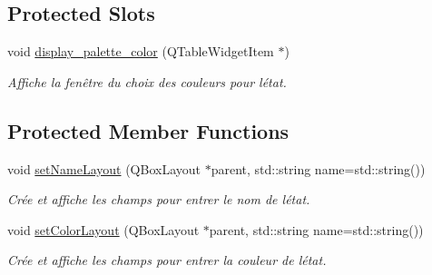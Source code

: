 \subsection*{Protected Slots}
\begin{DoxyCompactItemize}
\item 
void \mbox{\hyperlink{class_state_interface_a7cbb40dbcd158c1a871a50db7148e437}{display\+\_\+palette\+\_\+color}} (Q\+Table\+Widget\+Item $\ast$)
\begin{DoxyCompactList}\small\item\em Affiche la fenêtre du choix des couleurs pour l\textquotesingle{}état. \end{DoxyCompactList}\end{DoxyCompactItemize}
\subsection*{Protected Member Functions}
\begin{DoxyCompactItemize}
\item 
void \mbox{\hyperlink{class_state_interface_ac719c2f6bf1897ac5c7e852e73b95aca}{set\+Name\+Layout}} (Q\+Box\+Layout $\ast$parent, std\+::string name=std\+::string())
\begin{DoxyCompactList}\small\item\em Crée et affiche les champs pour entrer le nom de l\textquotesingle{}état. \end{DoxyCompactList}\item 
void \mbox{\hyperlink{class_state_interface_aaa101c2f5dc677034b0fdef57c45ce68}{set\+Color\+Layout}} (Q\+Box\+Layout $\ast$parent, std\+::string name=std\+::string())
\begin{DoxyCompactList}\small\item\em Crée et affiche les champs pour entrer la couleur de l\textquotesingle{}état. \end{DoxyCompactList}\end{DoxyCompactItemize}
